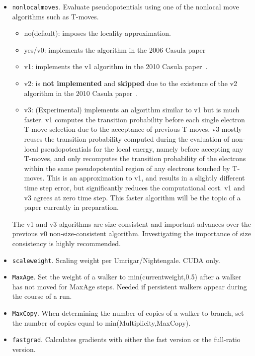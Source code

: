 \begin{itemize}
\item \texttt{nonlocalmoves}. Evaluate pseudopotentials using one of the nonlocal move algorithms such as T-moves.
\begin{itemize}
\item no(default): imposes the locality approximation.
\item yes/v0: implements the algorithm in the 2006 Casula paper~\cite{Casula2006}
\item v1: implements the v1 algorithm in the 2010 Casula paper~\cite{Casula2010}.
\item v2: is \textbf{not implemented} and \textbf{skipped} due to the existence of the v2 algorithm in the 2010 Casula paper~\cite{Casula2010}.
\item v3: (Experimental) implements an algorithm similar to v1 but is much faster. v1 computes the transition probability before each single electron T-move selection due to the acceptance of previous T-moves. v3 mostly reuses the transition probability computed during the evaluation of non-local pseudopotentials for the local energy, namely before accepting any T-moves, and only recomputes the transition probability of the electrons within the same pseudopotential region of any electrons touched by T-moves. This is an approximation to v1, and results in a slightly different time step error, but significantly reduces the computational cost. v1 and v3 agrees at zero time step. This faster algorithm will be the topic of a paper currently in preparation.
\end{itemize}
The v1 and v3 algorithms are size-consistent and important advances over the previous v0 non-size-consistent algorithm. Investigating the importance of size consistency is highly recommended.

\item \texttt{scaleweight}. Scaling weight per Umrigar/Nightengale.  CUDA only.

\item \texttt{MaxAge}. Set the weight of a walker to min(currentweight,0.5) after a walker has not moved for MaxAge steps.  Needed if persistent walkers appear during the course of a run.

\item \texttt{MaxCopy}. When determining the number of copies of a walker to branch, set the number of copies equal to min(Multiplicity,MaxCopy).

\item \texttt{fastgrad}. Calculates gradients with either the fast version or the full-ratio version.


\end{itemize}
